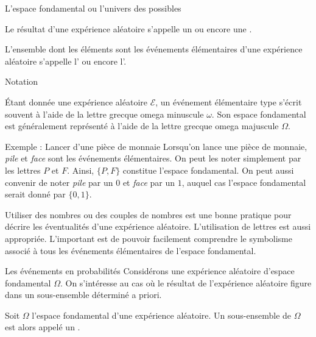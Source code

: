 \documentclass[nuit,charter,pied,handout]{BeamerJS}
\begin{document}
\begin{frame}[t]{L'espace fondamental ou l'univers des possibles}\pause 
	\begin{defn}
		Le résultat d'une expérience aléatoire s'appelle un  ou encore une .
	\end{defn}\pause 
	\begin{defn}
		L'ensemble dont les éléments sont les événements élémentaires d'une expérience aléatoire s'appelle l' ou encore l'\defi{univers des possibles}.
	\end{defn}
	\end{frame}
	\begin{frame}{Notation}
	\pause
	\begin{rem}
	Étant donnée une expérience aléatoire $\mathcal{E}$, un événement élémentaire type s'écrit souvent à l'aide de la lettre grecque omega minuscule $\omega$. \pause Son espace fondamental est généralement représenté à l'aide de la lettre grecque omega majuscule $\Omega$.
	\end{rem}
\end{frame}

\begin{frame}{Exemple : Lancer d'une pièce de monnaie}
	Lorsqu'on lance une pièce de monnaie, \textit{pile} et \textit{face} sont les événements élémentaires. On peut les noter simplement par les lettres $P$ et $F$. Ainsi, $\{P,F\}$ constitue l'espace fondamental. On peut aussi convenir de noter \textit{pile} par un $0$ et \textit{face} par un $1$, auquel cas l'espace fondamental serait donné par $\{0,1\}$.
	
	\pause 
	\begin{lumiere}
		Utiliser des nombres ou des couples de nombres est une bonne pratique pour décrire les éventualités d'une expérience aléatoire. L'utilisation de lettres est aussi appropriée. L'important est de pouvoir facilement comprendre le symbolisme associé à tous les événements élémentaires de l'espace fondamental.
	\end{lumiere}
\end{frame}

\begin{frame}[t]{Les événements en probabilités}\pause 
	Considérons une expérience aléatoire d'espace fondamental $\Omega$. On s'intéresse au cas où le résultat de l'expérience aléatoire figure dans un sous-ensemble déterminé a priori.\pause 
	\begin{defn}
		Soit $\Omega$ l'espace fondamental d'une expérience aléatoire. Un sous-ensemble de $\Omega$ est alors appelé un \defi{événement}.
	\end{defn}
\end{frame}
\end{document}
